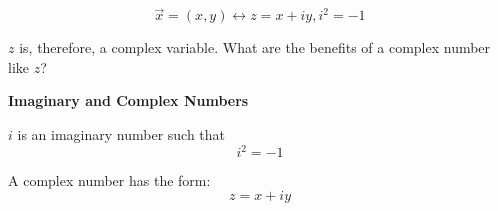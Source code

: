 \documentclass[10pt]{article}
\begin{document}
\begin{equation}
	\vec{x} = (x, y) \leftrightarrow z = x + iy, i^2 = -1
\end{equation}

$ z $ is, therefore, a complex variable. What are the benefits of a complex number like $ z $?


\begin{definition}

	\textbf{Imaginary and Complex Numbers} 

	$ i $ is an imaginary number such that
	\begin{equation}
		i^2 = -1
		\label{eq:389:i}
	\end{equation}

	A complex number has the form:
	\begin{equation}
		z = x + iy
		\label{eq:389:complex}
	\end{equation}
\end{definition}
\end{document}

